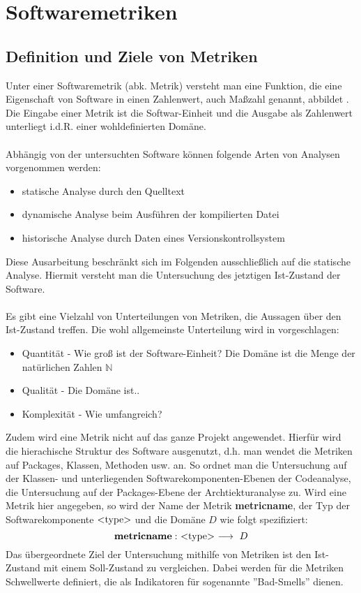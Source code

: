 \documentclass[12pt]{article}
\newcommand{\type}[1]{<\negthickspace\text{#1}\negthickspace> }
\begin{document}
\section{Softwaremetriken}\label{metriken}

\subsection{Definition und Ziele von Metriken}

Unter einer Softwaremetrik (abk. Metrik) versteht man eine
Funktion, die eine Eigenschaft von Software in einen Zahlenwert,
auch Maßzahl genannt, abbildet \cite{Wik18}. Die Eingabe einer Metrik ist
die Softwar-Einheit und die Ausgabe als Zahlenwert unterliegt
i.d.R. einer wohldefinierten Domäne. 
\\
\\
Abhängig von der untersuchten Software können folgende Arten von
Analysen vorgenommen werden:
\begin{itemize}
        \item statische Analyse durch den Quelltext
        \item dynamische Analyse beim Ausführen der
                kompilierten Datei
        \item historische Analyse durch Daten eines
                Versionskontrollsystem 
\end{itemize}
Diese Ausarbeitung beschränkt sich im Folgenden ausschließlich
auf die statische Analyse. Hiermit versteht man die Untersuchung
des jetztigen Ist-Zustand der Software. 
\\
\\
Es gibt eine Vielzahl von
Unterteilungen von Metriken, die Aussagen über den Ist-Zustand
treffen. Die wohl allgemeinste Unterteilung wird in \cite{Sne10} 
vorgeschlagen:

\begin{itemize}
        \item Quantität - Wie groß ist der Software-Einheit? Die
                Domäne ist die Menge der natürlichen Zahlen
                $\mathbb{N}$
        \item Qualität - Die Domäne ist..
        \item Komplexität - Wie umfangreich?
\end{itemize}
Zudem wird eine Metrik nicht auf das ganze Projekt angewendet.
Hierfür wird die hierachische Struktur des Software ausgenutzt,
d.h. man wendet die Metriken auf Packages, Klassen, Methoden usw.
an. So ordnet man die Untersuchung auf der Klassen- und
unterliegenden Softwarekomponenten-Ebenen der Codeanalyse, die
Untersuchung auf der Packages-Ebene der Archtiekturanalyse zu.
Wird eine Metrik hier angegeben, so wird der Name der Metrik
\textbf{metricname}, der Typ der Softwarekomponente $\type{type}$ und die
Domäne $D$ wie folgt spezifiziert:
\[
        \text{\textbf{metricname}}: ~ 
        \type{type}
        ~ \longrightarrow ~ D 
\]
Das übergeordnete Ziel der Untersuchung mithilfe von Metriken ist 
den Ist-Zustand mit einem Soll-Zustand zu vergleichen. Dabei
werden für die Metriken Schwellwerte definiert, die als
Indikatoren für sogenannte ''Bad-Smells'' dienen.
\end{document}
